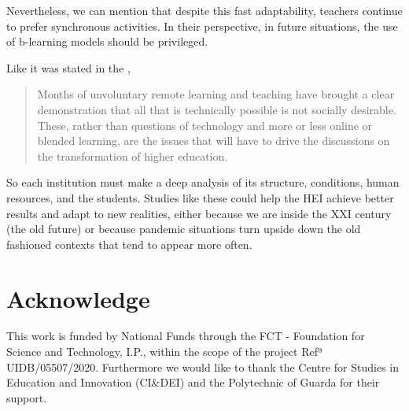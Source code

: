 \documentclass{textolivre}
\begin{document}
Nevertheless, we can mention that despite this fast adaptability, teachers continue to prefer synchronous activities. In their perspective, in future situations, the use of b-learning models should be privileged.

Like it was stated in the \textcite{gaebel2021},

\begin{quote}
    Months of unvoluntary remote learning and teaching have brought a clear demonstration that all that is technically possible is not socially desirable. These, rather than questions of technology and more or less online or blended learning, are the issues that will have to drive the discussions on the transformation of higher education.
\end{quote}

So each institution must make a deep analysis of its structure, conditions, human resources, and the students. Studies like these could help the HEI achieve better results and adapt to new realities, either because we are inside the XXI century (the old future) or because pandemic situations turn upside down the old fashioned contexts that tend to appear more often.

\section*{Acknowledge}
This work is funded by National Funds through the FCT - Foundation for Science and Technology, I.P., within the scope of the project Refª UIDB/05507/2020. Furthermore we would like to thank the Centre for Studies in Education and Innovation (CI\&DEI) and the Polytechnic of Guarda for their support. 



\printbibliography\label{sec-bib}
\end{document}
